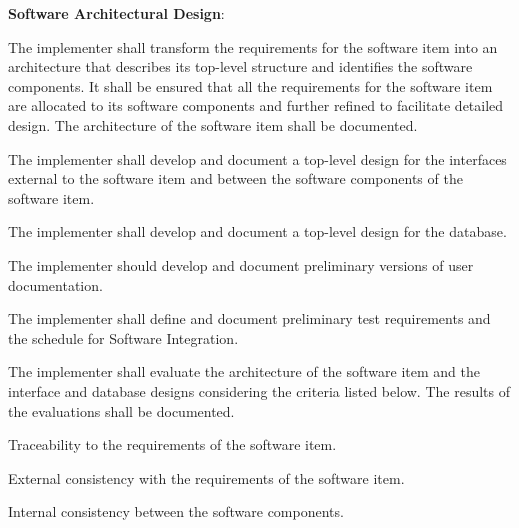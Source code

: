 			\begin{adjustwidth}{2em}{0pt} 

				\begin{compactenum}

					\item {\bf Software Architectural Design}:

					\begin{compactenum}

						\item The implementer shall transform the requirements for the software item into an architecture that describes its top-level structure and identifies the software components. It shall be ensured that all the requirements for the software item are allocated to its software components and further refined to facilitate detailed design. The architecture of the software item shall be documented.

						\item The implementer shall develop and document a top-level design for the interfaces external to the software item and between the software components of the software item.

						\item The implementer shall develop and document a top-level design for the database.

						\item The implementer should develop and document preliminary versions of user documentation.

						\item The implementer shall define and document preliminary test requirements and the schedule for Software Integration.

						\item The implementer shall evaluate the architecture of the software item and the interface and database designs considering the criteria listed below. The results of the evaluations shall be documented.

						\begin{compactenum}

							\item Traceability to the requirements of the software item.

							\item External consistency with the requirements of the software item.

							\item Internal consistency between the software components.


\end{compactenum}
\end{compactenum}
\end{compactenum}
\end{adjustwidth}
